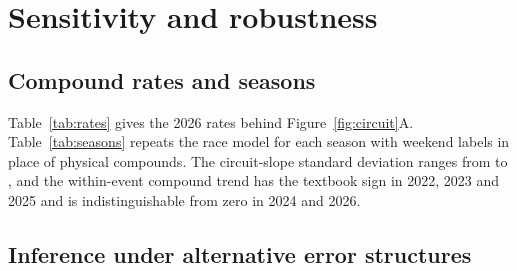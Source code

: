 \appendix
{}

\section{Sensitivity and robustness}\label{app:sens}

\subsection{Compound rates and seasons}

Table~\ref{tab:rates} gives the 2026 rates behind Figure~\ref{fig:circuit}A.
Table~\ref{tab:seasons} repeats the race model for each season with weekend labels in place of physical compounds.
The circuit-slope standard deviation ranges from \CircuitSDSeasonTwentyFive{} to \CircuitSDSeasonTwentySix\spl, and the within-event compound trend has the textbook sign in 2022, 2023 and 2025 and is indistinguishable from zero in 2024 and 2026.

\begin{table}[t]
\centering\small

\caption{Race degradation rate per compound in 2026 (seconds lost per lap of tyre age) from the mixed model of Eq.~\eqref{eq:race}, with 95\% Wald intervals. The circuit-slope standard deviation has a 95\% profile-likelihood interval. The last row is the within-event trend per step from a harder to a softer compound, estimated with one fixed slope per event (negative means softer compounds degrade more slowly within the same race).}
\label{tab:rates}
\end{table}

\begin{table}[t]
\centering\small

\caption{Race model by season with hard, medium and soft labels in place of the physical compounds of Table~\ref{tab:rates}, so the 2026 row differs slightly from it (circuit-slope SD and within-event trend). The within-event trend is the change in degradation rate (s/lap) per step from a harder to a softer label with one slope per event, with a 95\% Wald interval; positive is the textbook sign.}
\label{tab:seasons}
\end{table}

\subsection{Inference under alternative error structures}\label{app:inference}

